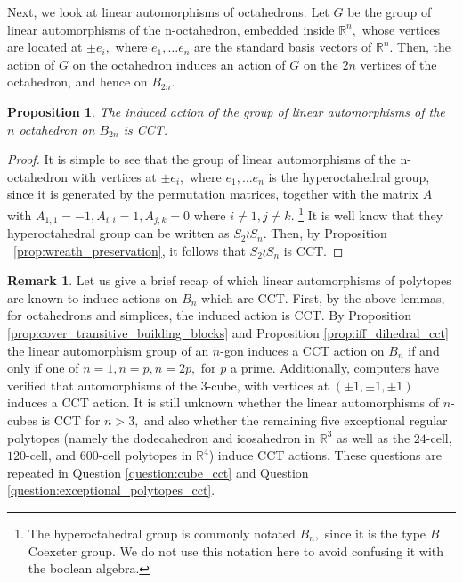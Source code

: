 \documentclass[10 pt]{amsart}
\theoremstyle{plain}
\newtheorem{prop}[thm]{Proposition}
\theoremstyle{definition}
\newtheorem{rem}[thm]{Remark}
\theoremstyle{remark}
\numberwithin{equation}{section}
\begin{document}
Next, we look at linear automorphisms of octahedrons. Let $G$ be the group of linear automorphisms of the n-octahedron, embedded inside $\mathbb R^n,$ whose vertices are located at $\pm e_i,$ where $e_1,\ldots e_n$ are the standard basis vectors of $\mathbb R^n.$ Then, the action of $G$ on the octahedron induces an action of $G$ on the $2n$ vertices of the octahedron, and hence on $B_{2n}.$

\begin{prop}
The induced action of the group of linear automorphisms of the $n$ octahedron on $B_{2n}$ is CCT.
\end{prop}
\begin{proof}
It is simple to see that the group of linear automorphisms of the n-octahedron with vertices at $\pm e_i,$ where $e_1,\ldots e_n$ is the hyperoctahedral group, since it is generated by the permutation matrices, together with the matrix $A$ with $A_{1,1} = -1,A_{i,i} = 1,A_{j,k} = 0$ where $i \neq 1, j \neq k.$ \footnote{The hyperoctahedral group is commonly notated $B_n,$ since it is the type $B$ Coexeter group. We do not use this notation here to avoid confusing it with the boolean algebra.} It is well know that they hyperoctahedral group can be written as $S_2 \wr S_n.$ Then, by Proposition ~\ref{prop:wreath_preservation}, it follows that $S_2 \wr S_n$ is CCT.
\end{proof}

\begin{rem}
Let us give a brief recap of which linear automorphisms of polytopes are known to induce actions on $B_n$ which are CCT. First, by the above lemmas, for octahedrons and simplices, the induced action is CCT. By Proposition  \ref{prop:cover_transitive_building_blocks} and Proposition \ref{prop:iff_dihedral_cct} the linear automorphism group of an $n$-gon induces a CCT action on $B_n$ if and only if one of $n=1,n = p,n = 2p,$ for $p$ a prime. Additionally, computers have verified that automorphisms of the 3-cube, with vertices at $(\pm 1,\pm 1,\pm 1)$ induces a CCT action. It is still unknown whether the linear automorphisms of $n$-cubes is CCT for $n> 3,$ and also whether the remaining five exceptional regular polytopes (namely the dodecahedron and icosahedron in $\mathbb R^3$ as well as the $24$-cell, $120$-cell, and $600$-cell polytopes in $\mathbb R^4$) induce CCT actions. These questions are repeated in Question \ref{question:cube_cct} and Question \ref{question:exceptional_polytopes_cct}.

\end{rem}
\end{document}
